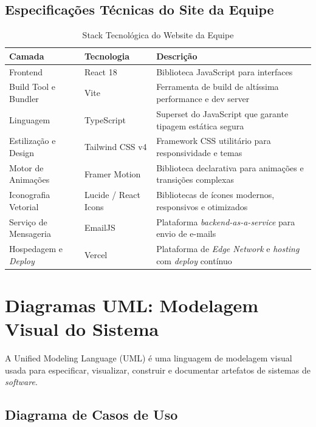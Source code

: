 \documentclass[11pt,a4paper]{article}
\begin{document}
\subsection{Especificações Técnicas do Site da Equipe}

\begin{table}[H]
\centering
\caption{Stack Tecnológica do Website da Equipe}
\label{tab:stack-web}
\begin{tabular}{|l|l|>{\raggedright\arraybackslash}p{6cm}|}
\hline
\textbf{Camada} & \textbf{Tecnologia} & \textbf{Descrição} \\
\hline
Frontend & React 18 & Biblioteca JavaScript para interfaces \\
Build Tool e Bundler & Vite & Ferramenta de build de altíssima performance e dev server \\
Linguagem & TypeScript & Superset do JavaScript que garante tipagem estática segura \\
Estilização e Design & Tailwind CSS v4 & Framework CSS utilitário para responsividade e temas \\
Motor de Animações & Framer Motion & Biblioteca declarativa para animações e transições complexas \\
Iconografia Vetorial & Lucide / React Icons & Bibliotecas de ícones modernos, responsivos e otimizados \\
Serviço de Mensageria & EmailJS & Plataforma \textit{backend-as-a-service} para envio de e-mails \\
Hospedagem e \textit{Deploy} & Vercel & Plataforma de \textit{Edge Network} e \textit{hosting} com \textit{deploy} contínuo \\
\hline
\end{tabular}
\end{table}

\section{Diagramas UML: Modelagem Visual do Sistema}

A Unified Modeling Language (UML) \cite{booch2005} é uma linguagem de modelagem visual usada para especificar, visualizar, construir e documentar artefatos de sistemas de \textit{software}.

\subsection{Diagrama de Casos de Uso}
\end{document}
